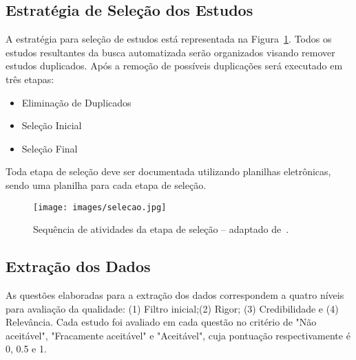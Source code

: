 \subsection{Estratégia de Seleção dos Estudos}

A estratégia para seleção de estudos está representada na Figura~\ref{image:selecao}. Todos os estudos resultantes da busca automatizada serão organizados visando remover estudos duplicados. 
Após a remoção de possíveis duplicações será executado em três etapas: 

\begin{itemize}
\item Eliminação de Duplicados
\item Seleção Inicial
\item Seleção Final
\end{itemize}

Toda etapa de seleção deve ser documentada utilizando planilhas eletrônicas, sendo uma planilha para cada etapa de seleção.

\begin{figure}[ht]
\label{image:selecao}
\centering
\texttt{[image: images/selecao.jpg]}
\caption{Sequência de atividades da etapa de seleção -- adaptado de~\cite{nakagawa2017revisao}.}
\end{figure}

\subsection{Extração dos Dados}
As questões elaboradas para a extração dos dados correspondem a quatro níveis para avaliação da qualidade: (1) Filtro inicial;(2) Rigor; (3) Credibilidade e (4) Relevância. Cada estudo foi avaliado em cada questão no critério de "Não aceitável", "Fracamente aceitável" e "Aceitável", cuja pontuação respectivamente é 0, 0.5 e 1.

